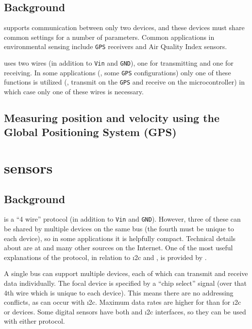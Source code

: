\subsection{\color{gray} Background \color{black}}
	\uart supports communication between only two devices, and these devices must share common settings for a number of parameters. %
Common applications in environmental sensing include \texttt{GPS} receivers and Air Quality Index sensors.

\uart uses two wires (in addition to \texttt{Vin} and \texttt{GND}), one for transmitting and one for receiving.
In some applications (\eg, some \texttt{GPS} configurations) only one of these functions is utilized (\eg, transmit on the \texttt{GPS} and receive on the microcontroller) in which case only one of these wires is necessary.
\subsection{\color{gray} Measuring position and velocity using the Global Positioning System (GPS) \color{black}}


\section{\spi sensors}
\subsection{Background}
\spi is a ``4 wire'' protocol (in addition to \texttt{Vin} and \texttt{GND}).
However, three of these can be shared by multiple devices on the same \spi bus (the fourth must be unique to each device), so in some applications it is helpfully compact.
Technical details about \spi are at  and many other sources on the Internet.
One of the most useful explanations of the \spi protocol, in relation to \i2c and \uart, is provided by .

A single \spi bus can support multiple devices, each of which can transmit and receive data individually.
The focal device is specified by a ``chip select'' signal (over that 4th wire which is unique to each device).
This means there are no addressing conflicts, as can occur with \i2c.
Maximum data rates are higher for \spi than for \i2c or \uart devices.
Some digital sensors have both \spi and \i2c interfaces, so they can be used with either protocol.

